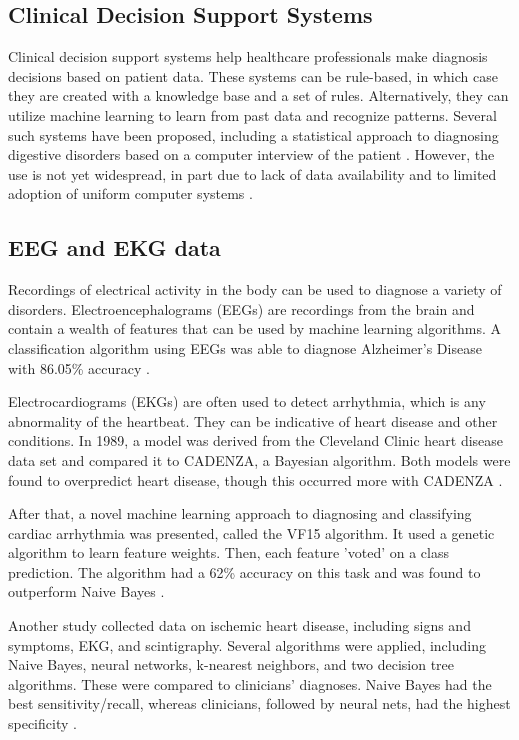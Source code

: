 \documentclass[draftcopy]{srpaper}
\begin{document}
\subsection{Clinical Decision Support Systems}
Clinical decision support systems help healthcare professionals make
diagnosis decisions based on patient data. These systems can be
rule-based, in which case they are created with a knowledge base and
a set of rules. Alternatively, they can utilize machine learning to
learn from past data and recognize patterns. Several such
systems have been proposed, including a statistical approach to
diagnosing digestive disorders based on a computer interview of the
patient \cite{SK84}. However, the use is not yet widespread, in part
due to lack of data availability and to limited adoption of uniform
computer systems \cite{Greenes2007}.

\subsection{EEG and EKG data}
Recordings of electrical activity in the body can be used to diagnose a variety of
disorders. Electroencephalograms (EEGs) are recordings from the brain
and contain a wealth of features that can be used by machine learning
algorithms. A classification algorithm using EEGs was able to diagnose
Alzheimer's Disease with 86.05\% accuracy \cite{Pod12}.

Electrocardiograms (EKGs) are often used to detect arrhythmia, which is any
abnormality of the heartbeat. They can be indicative of heart disease
and other conditions. In 1989, a model was derived from the Cleveland Clinic heart disease data set and
compared it to CADENZA, a Bayesian algorithm. Both models were found
to overpredict heart disease, though this occurred more with CADENZA
\cite{Det89}. 

After that, a novel machine learning approach to diagnosing and
classifying cardiac arrhythmia was presented, called the VF15
algorithm. It used a genetic algorithm to learn feature weights. Then,
each feature 'voted’ on a class prediction. The algorithm had a 62\%
accuracy on this task and was found to outperform Naive Bayes \cite{GAD98}.

Another study collected data on ischemic heart disease, including signs and
symptoms, EKG, and scintigraphy. Several algorithms were applied, including Naive Bayes, neural networks,
k-nearest neighbors, and two decision tree algorithms. These were compared to clinicians’ diagnoses. Naive Bayes had the best
sensitivity/recall, whereas clinicians, followed by neural nets, had
the highest specificity \cite{KKG+99}.
\end{document}
